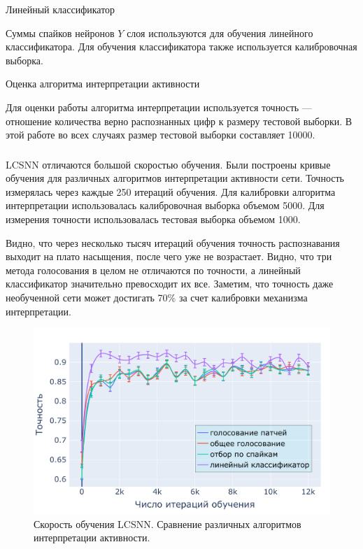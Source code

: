 \documentclass[a4paper]{article}
\begin{document}
\begin{center}
 Линейный классификатор
\end{center}
Суммы спайков нейронов $Y$ слоя используются для обучения линейного классификатора. Для обучения классификатора также используется калибровочная выборка.

\begin{center}
 Оценка алгоритма интерпретации активности
\end{center}
Для оценки работы алгоритма интерпретации используется точность --- отношение количества верно распознанных цифр к размеру тестовой выборки. В этой работе во всех случаях размер тестовой выборки составляет 10000. 

\subsubsection{}
LCSNN отличаются большой скоростью обучения. Были построены кривые обучения для различных алгоритмов интерпретации активности сети. Точность измерялась через каждые 250 итераций обучения. Для калибровки алгоритма интерпретации использовалась калибровочная выборка объемом 5000. Для измерения точности использовалась тестовая выборка объемом 1000.

Видно, что через несколько тысяч итераций обучения точность распознавания выходит на плато насыщения, после чего уже не возрастает. Видно, что три метода голосования в целом не отличаются по точности, а линейный классификатор значительно превосходит их все. Заметим, что точность даже необученной сети может достигать 70\% за счет калибровки механизма интерпретации.

\begin{center}
\begin{figure}[H] 
 \includegraphics[width=\textwidth,keepaspectratio=true]{LCSNN_learning_rate_ru.pdf}
 \caption{Скорость обучения LCSNN. Сравнение различных алгоритмов интерпретации активности.}
\end{figure}
\end{center}
\end{document}
